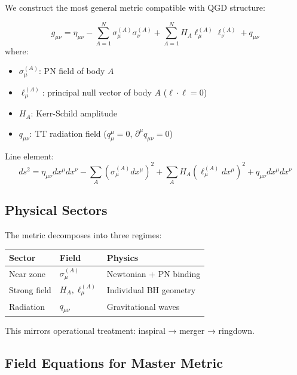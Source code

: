 \documentclass[11pt,a4paper]{article}
\theoremstyle{definition}
\theoremstyle{remark}
\begin{document}
	We construct the most general metric compatible with QGD structure:
	
		\begin{equation}\label{eq:master_metric}
			\boxed{g_{\mu\nu} = \eta_{\mu\nu} - \sum_{A=1}^N\sigma_\mu^{(A)}\sigma_\nu^{(A)} + \sum_{A=1}^N H_A\ell_\mu^{(A)}\ell_\nu^{(A)} + q_{\mu\nu}}
		\end{equation}
		where:
		\begin{itemize}
			\item $\sigma_\mu^{(A)}$: PN field of body $A$
			\item $\ell_\mu^{(A)}$: principal null vector of body $A$ ($\ell \cdot \ell = 0$)
			\item $H_A$: Kerr-Schild amplitude
			\item $q_{\mu\nu}$: TT radiation field ($q^\mu_\mu = 0$, $\partial^\mu q_{\mu\nu} = 0$)
		\end{itemize}
	
	Line element:
	\begin{equation}\label{eq:master_line_element}
		\boxed{ds^2 = \eta_{\mu\nu}dx^\mu dx^\nu - \sum_A(\sigma_\mu^{(A)}dx^\mu)^2 + \sum_A H_A(\ell_\mu^{(A)}dx^\mu)^2 + q_{\mu\nu}dx^\mu dx^\nu}
	\end{equation}
	
	\subsection{Physical Sectors}
	
	The metric decomposes into three regimes:
	
	\begin{center}
		\begin{tabular}{lll}
			\toprule
			\textbf{Sector} & \textbf{Field} & \textbf{Physics}\\
			\midrule
			Near zone & $\sigma_\mu^{(A)}$ & Newtonian + PN binding\\
			Strong field & $H_A, \ell_\mu^{(A)}$ & Individual BH geometry\\
			Radiation & $q_{\mu\nu}$ & Gravitational waves\\
			\bottomrule
		\end{tabular}
	\end{center}
	
	This mirrors operational treatment: inspiral → merger → ringdown.
	
	\subsection{Field Equations for Master Metric}
	
\end{document}
